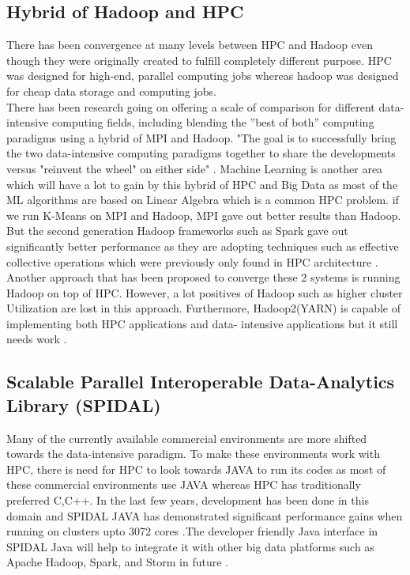 \documentclass[sigconf]{acmart}
\begin{document}
\subsection{Hybrid of Hadoop and HPC}
There has been convergence at many levels between HPC and Hadoop even though they were originally created to fulfill completely different purpose. HPC was designed for high-end, parallel computing jobs whereas hadoop was designed for cheap data storage and computing jobs. 
\\
There has been research going on offering a scale of comparison for different data-intensive computing fields, including blending the ''best of both'' computing paradigms using a hybrid of MPI and Hadoop. "The goal is to successfully bring the two data-intensive computing paradigms together to share the developments versus "reinvent the wheel" on either side" \cite{Luckow2013}. Machine Learning is another area which will have a lot to gain by this hybrid of HPC and Big Data as most of the ML algorithms are based on Linear Algebra which is a common HPC problem. if we run K-Means on MPI and Hadoop, MPI gave out better results than Hadoop. But the second generation Hadoop frameworks such as Spark gave out significantly better performance as they are adopting techniques such as effective collective operations which were previously only found in HPC architecture \cite{Luckow2013}. \\
Another approach that has been proposed to converge these 2 systems is running Hadoop on top of HPC. However, a lot positives of Hadoop such as higher cluster Utilization are lost in this approach. Furthermore, Hadoop2(YARN) is capable of implementing both HPC applications and data- intensive applications but it still needs work \cite{JhaQLMF14}.

\subsection{Scalable Parallel Interoperable Data-Analytics Library (SPIDAL)}
Many of the currently available commercial environments are more shifted towards the data-intensive paradigm. To make these environments work with HPC, there is need for HPC to look towards JAVA to run its codes as most of these commercial environments use JAVA whereas HPC has traditionally preferred C,C++. In the last few years, development has been done in this domain and SPIDAL JAVA has demonstrated significant performance gains when running on clusters upto 3072 cores \cite{Spidal}.The developer friendly Java interface in SPIDAL Java will help to integrate it with other big data platforms such as Apache Hadoop, Spark, and Storm in future \cite{Spidal}.
\end{document}
